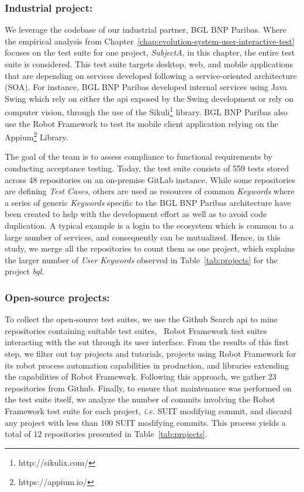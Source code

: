 \subsubsection{Industrial project:}
We leverage the codebase of our industrial partner, BGL BNP Paribas. Where the empirical analysis from Chapter~\ref{chap:evolution-system-user-interactive-test} focuses on the test suite for one project, \emph{SubjectA}, in this chapter, the entire test suite is considered. This test suite targets desktop, web, and mobile applications that are depending on services developed following a service-oriented architecture (SOA). For instance, BGL BNP Paribas developed internal services using Java Swing which rely on either the \gls{api} exposed by the Swing development or rely on computer vision, through the use of the Sikuli\footnote{http://sikulix.com/} library. BGL BNP Paribas also use the Robot Framework to test its mobile client application relying on the Appium\footnote{https://appium.io/} Library.

The goal of the team is to assess compliance to functional requirements by conducting acceptance testing. Today, the test suite consists of 559 tests stored across 48 repositories on an on-premise GitLab instance. While some repositories are defining \emph{Test Cases}, others are used as resources of common \emph{Keywords} where a series of generic \emph{Keywords} specific to the BGL BNP Paribas architecture have been created to help with the development effort as well as to avoid code duplication. A typical example is a login to the ecosystem which is common to a large number of services, and consequently can be mutualized. Hence, in this study, we merge all the repositories to count them as one project, which explains the larger number of \emph{User Keywords} observed in Table~\ref{tab:projects} for the project \emph{bgl}.

\subsubsection{Open-source projects:} 
To collect the open-source test suites, we use the Github Search \gls{api} to mine repositories containing suitable test suites, \ie\ Robot Framework test suites interacting with the \gls{sut} through its user interface. From the results of this first step, we filter out toy projects and tutorials, projects using Robot Framework for its robot process automation capabilities in production, and libraries extending the capabilities of Robot Framework. Following this approach, we gather 23 repositories from Github. Finally, to ensure that maintenance was performed on the test suite itself, we analyze the number of commits involving the Robot Framework test suite for each project, \emph{i.e.} SUIT modifying commit, and discard any project with less than 100 SUIT modifying commits. This process yields a total of 12 repositories presented in Table~\ref{tab:projects}.

